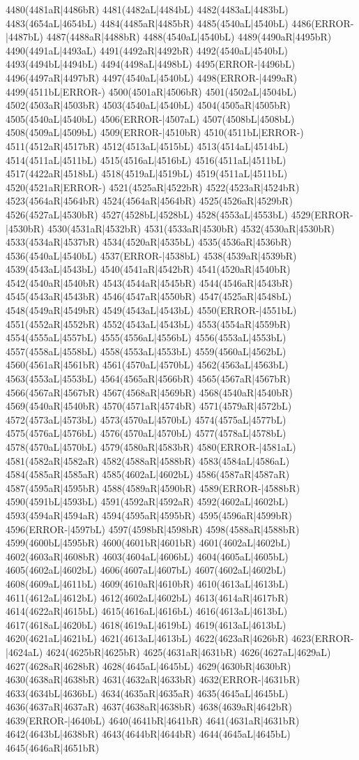 4480(4481aR|4486bR) 4481(4482aL|4484bL) 4482(4483aL|4483bL) 4483(4654aL|4654bL) 4484(4485aR|4485bR) 4485(4540aL|4540bL) 4486(ERROR-|4487bL) 4487(4488aR|4488bR) 4488(4540aL|4540bL) 4489(4490aR|4495bR) 4490(4491aL|4493aL) 4491(4492aR|4492bR) 4492(4540aL|4540bL) 4493(4494bL|4494bL) 4494(4498aL|4498bL) 4495(ERROR-|4496bL) 4496(4497aR|4497bR) 4497(4540aL|4540bL) 4498(ERROR-|4499aR) 4499(4511bL|ERROR-) 4500(4501aR|4506bR) 4501(4502aL|4504bL) 4502(4503aR|4503bR) 4503(4540aL|4540bL) 4504(4505aR|4505bR) 4505(4540aL|4540bL) 4506(ERROR-|4507aL) 4507(4508bL|4508bL) 4508(4509aL|4509bL) 4509(ERROR-|4510bR) 4510(4511bL|ERROR-) 4511(4512aR|4517bR) 4512(4513aL|4515bL) 4513(4514aL|4514bL) 4514(4511aL|4511bL) 4515(4516aL|4516bL) 4516(4511aL|4511bL) 4517(4422aR|4518bL) 4518(4519aL|4519bL) 4519(4511aL|4511bL) 4520(4521aR|ERROR-) 4521(4525aR|4522bR) 4522(4523aR|4524bR) 4523(4564aR|4564bR) 4524(4564aR|4564bR) 4525(4526aR|4529bR) 4526(4527aL|4530bR) 4527(4528bL|4528bL) 4528(4553aL|4553bL) 4529(ERROR-|4530bR) 4530(4531aR|4532bR) 4531(4533aR|4530bR) 4532(4530aR|4530bR) 4533(4534aR|4537bR) 4534(4520aR|4535bL) 4535(4536aR|4536bR) 4536(4540aL|4540bL) 4537(ERROR-|4538bL) 4538(4539aR|4539bR) 4539(4543aL|4543bL) 4540(4541aR|4542bR) 4541(4520aR|4540bR) 4542(4540aR|4540bR) 4543(4544aR|4545bR) 4544(4546aR|4543bR) 4545(4543aR|4543bR) 4546(4547aR|4550bR) 4547(4525aR|4548bL) 4548(4549aR|4549bR) 4549(4543aL|4543bL) 4550(ERROR-|4551bL) 4551(4552aR|4552bR) 4552(4543aL|4543bL) 4553(4554aR|4559bR) 4554(4555aL|4557bL) 4555(4556aL|4556bL) 4556(4553aL|4553bL) 4557(4558aL|4558bL) 4558(4553aL|4553bL) 4559(4560aL|4562bL) 4560(4561aR|4561bR) 4561(4570aL|4570bL) 4562(4563aL|4563bL) 4563(4553aL|4553bL) 4564(4565aR|4566bR) 4565(4567aR|4567bR) 4566(4567aR|4567bR) 4567(4568aR|4569bR) 4568(4540aR|4540bR) 4569(4540aR|4540bR) 4570(4571aR|4574bR) 4571(4579aR|4572bL) 4572(4573aL|4573bL) 4573(4570aL|4570bL) 4574(4575aL|4577bL) 4575(4576aL|4576bL) 4576(4570aL|4570bL) 4577(4578aL|4578bL) 4578(4570aL|4570bL) 4579(4580aR|4583bR) 4580(ERROR-|4581aL) 4581(4582aR|4582aR) 4582(4588aR|4588bR) 4583(4584aL|4586aL) 4584(4585aR|4585aR) 4585(4602aL|4602bL) 4586(4587aR|4587aR) 4587(4595aR|4595bR) 4588(4589aR|4590bR) 4589(ERROR-|4588bR) 4590(4591bL|4593bL) 4591(4592aR|4592aR) 4592(4602aL|4602bL) 4593(4594aR|4594aR) 4594(4595aR|4595bR) 4595(4596aR|4599bR) 4596(ERROR-|4597bL) 4597(4598bR|4598bR) 4598(4588aR|4588bR) 4599(4600bL|4595bR) 4600(4601bR|4601bR) 4601(4602aL|4602bL) 4602(4603aR|4608bR) 4603(4604aL|4606bL) 4604(4605aL|4605bL) 4605(4602aL|4602bL) 4606(4607aL|4607bL) 4607(4602aL|4602bL) 4608(4609aL|4611bL) 4609(4610aR|4610bR) 4610(4613aL|4613bL) 4611(4612aL|4612bL) 4612(4602aL|4602bL) 4613(4614aR|4617bR) 4614(4622aR|4615bL) 4615(4616aL|4616bL) 4616(4613aL|4613bL) 4617(4618aL|4620bL) 4618(4619aL|4619bL) 4619(4613aL|4613bL) 4620(4621aL|4621bL) 4621(4613aL|4613bL) 4622(4623aR|4626bR) 4623(ERROR-|4624aL) 4624(4625bR|4625bR) 4625(4631aR|4631bR) 4626(4627aL|4629aL) 4627(4628aR|4628bR) 4628(4645aL|4645bL) 4629(4630bR|4630bR) 4630(4638aR|4638bR) 4631(4632aR|4633bR) 4632(ERROR-|4631bR) 4633(4634bL|4636bL) 4634(4635aR|4635aR) 4635(4645aL|4645bL) 4636(4637aR|4637aR) 4637(4638aR|4638bR) 4638(4639aR|4642bR) 4639(ERROR-|4640bL) 4640(4641bR|4641bR) 4641(4631aR|4631bR) 4642(4643bL|4638bR) 4643(4644bR|4644bR) 4644(4645aL|4645bL) 4645(4646aR|4651bR) 